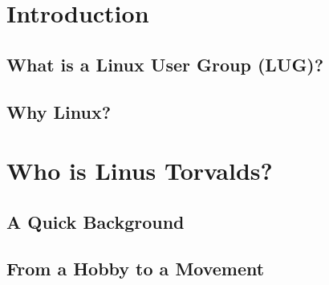 \newcommand{\sessionnumber}{1}
\newcommand{\sessiontitle}{Introduction to Linux and Open Source}
\newcommand{\sessiondate}{\today}
\newcommand{\sessionabstract}{This document serves as the first installment in the Linux User Group document series, providing a comprehensive introduction to Linux, its history, and the open-source ecosystem. Topics covered include the biography of Linus Torvalds, the evolution of the Linux kernel, version control with Git, and an overview of popular Linux distributions.}




	
    \maketitle
    
    \makeabstract
    
    \vfill
    
    \makelicense
    
    \newpage
    
    \tableofcontents
    \newpage
    
    
    
    \section{Introduction}
    \subsection{What is a Linux User Group (LUG)?}
    \subsection{Why Linux?}
    
    \section{Who is Linus Torvalds?}
    \subsection{A Quick Background}
    \subsection{From a Hobby to a Movement}
    
